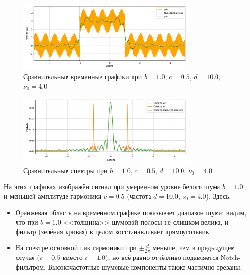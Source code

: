 \documentclass[a4paper]{article}
\begin{document}
\begin{figure}[H]
    \centering
    \includegraphics[width=0.8\textwidth]{src/npf/time_1.0_0.5_10.0_4.0.png}
    \caption{Сравнительные временные графики при $b=1.0$, $c=0.5$, $d=10.0$, $\nu_0=4.0$}
\end{figure}
\begin{figure}[H]
    \centering
    \includegraphics[width=0.8\textwidth]{src/npf/spec_1.0_0.5_10.0_4.0.png}
    \caption{Сравнительные спектры при $b=1.0$, $c=0.5$, $d=10.0$, $\nu_0=4.0$}
\end{figure}
На этих графиках изображён сигнал при умеренном уровне белого шума $b=1.0$ и меньшей амплитуде гармоники $c=0.5$ (частота $d=10.0$, $\nu_0=4.0$). Здесь:
\begin{itemize}
    \item Оранжевая область на временном графике показывает диапазон шума: видим, что при $b=1.0$ <<толщина>> шумовой полосы не слишком велика, и фильтр (зелёная кривая) в целом восстанавливает прямоугольник.
    \item На спектре основной пик гармоники при $\pm \frac{d}{2\pi}$ меньше, чем в предыдущем случае ($c=0.5$ вместо $c=1.0$), но всё равно отчётливо подавляется Notch-фильтром. Высокочастотные шумовые компоненты также частично срезаны.
\end{itemize}
\end{document}
